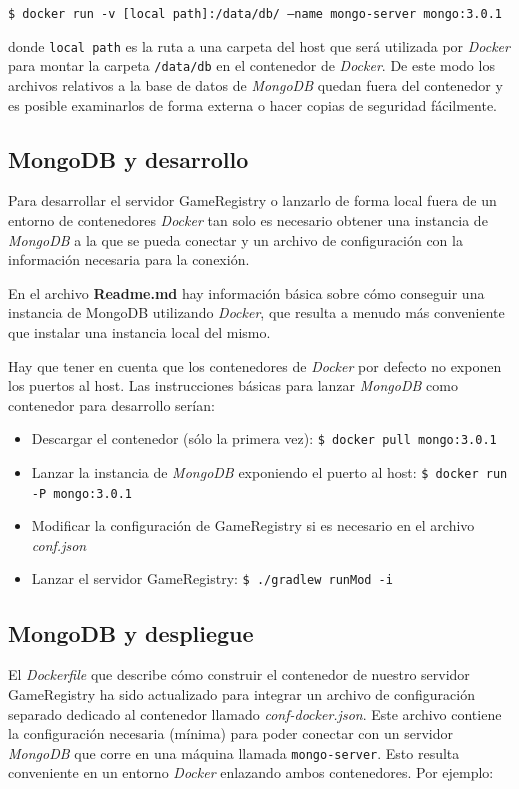 \documentclass[12pt,a4paper]{report}
\begin{document}
\texttt{\$ docker run -v [local path]:/data/db/ --name mongo-server mongo:3.0.1}

donde \texttt{local path} es la ruta a una carpeta del host que será utilizada por \emph{Docker}
para montar la carpeta \texttt{/data/db} en el contenedor de \emph{Docker}. De este modo
los archivos relativos a la base de datos de \emph{MongoDB} quedan fuera del contenedor y es
posible examinarlos de forma externa o hacer copias de seguridad fácilmente.

\subsection{MongoDB y desarrollo}
Para desarrollar el servidor GameRegistry o lanzarlo de forma local fuera de un entorno
de contenedores \emph{Docker} tan solo es necesario obtener una instancia de \emph{MongoDB}
a la que se pueda conectar y un archivo de configuración con la información necesaria para
la conexión.

En el archivo \textbf{Readme.md} hay información básica sobre cómo conseguir una instancia
de MongoDB utilizando \emph{Docker}, que resulta a menudo más conveniente que instalar una
instancia local del mismo.

Hay que tener en cuenta que los contenedores de \emph{Docker} por defecto no exponen los puertos
al host. Las instrucciones básicas para lanzar \emph{MongoDB} como contenedor para desarrollo 
serían:

\begin{itemize}
 \item Descargar el contenedor (sólo la primera vez): \texttt{\$ docker pull mongo:3.0.1}
 \item Lanzar la instancia de \emph{MongoDB} exponiendo el puerto al host: 
       \texttt{\$ docker run -P mongo:3.0.1}
 \item Modificar la configuración de GameRegistry si es necesario en el archivo \emph{conf.json}
 \item Lanzar el servidor GameRegistry: \texttt{\$ ./gradlew runMod -i}
\end{itemize}

\subsection{MongoDB y despliegue}
El \emph{Dockerfile} que describe cómo construir el contenedor de nuestro servidor GameRegistry
ha sido actualizado para integrar un archivo de configuración separado dedicado al contenedor 
llamado \emph{conf-docker.json}. Este archivo contiene la configuración necesaria (mínima) para
poder conectar con un servidor \emph{MongoDB} que corre en una máquina llamada \texttt{mongo-server}.
Esto resulta conveniente en un entorno \emph{Docker} enlazando ambos contenedores. Por ejemplo:
\end{document}
